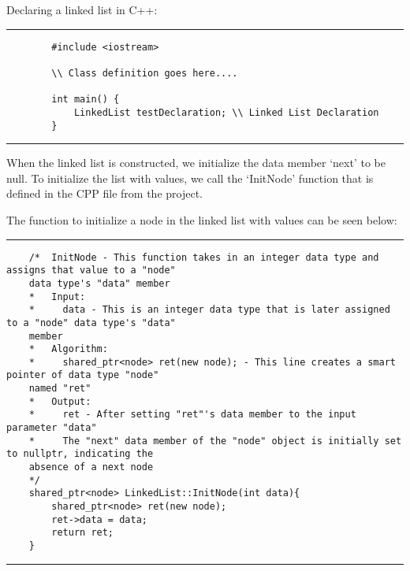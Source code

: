\documentclass[a4paper,9pt]{article}
\newcommand{\horizontalline}{\noindent \rule{\textwidth}{0.5pt}\par}
\begin{document}
\begin{highlight}
    Declaring a linked list in C++:

    \horizontalline

    \begin{verbatim}
        #include <iostream>

        \\ Class definition goes here....

        int main() {
            LinkedList testDeclaration; \\ Linked List Declaration
        }
    \end{verbatim}

    \horizontalline
\end{highlight}

When the linked list is constructed, we initialize the data member `next' to be null. To initialize the list with values, we call
the `InitNode' function that is defined in the CPP file from the project.

\begin{highlight}
    The function to initialize a node in the linked list with values can be seen below:

    \horizontalline

    \begin{verbatim}
    /*  InitNode - This function takes in an integer data type and assigns that value to a "node" 
    data type's "data" member
    *   Input:
    *     data - This is an integer data type that is later assigned to a "node" data type's "data" 
    member
    *   Algorithm:
    *     shared_ptr<node> ret(new node); - This line creates a smart pointer of data type "node" 
    named "ret"
    *   Output:
    *     ret - After setting "ret"'s data member to the input parameter "data"
    *     The "next" data member of the "node" object is initially set to nullptr, indicating the 
    absence of a next node
    */
    shared_ptr<node> LinkedList::InitNode(int data){
        shared_ptr<node> ret(new node);
        ret->data = data;
        return ret;
    }
    \end{verbatim}

    \horizontalline
\end{highlight}
\end{document}
